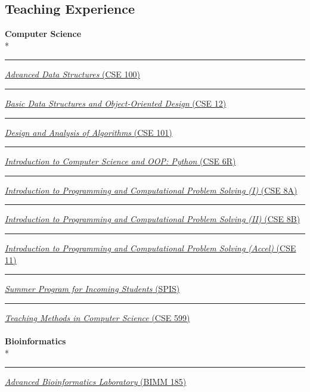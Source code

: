 \documentclass[margin,line]{res}
\begin{document}
\begin{resume}
\section{\sc Teaching Experience}
\textbf{Computer Science}\\*
\rule{-1mm}{5mm} \hspace*{4mm} \href{https://sites.google.com/a/eng.ucsd.edu/cse-100-winter-2016/}{\textit{Advanced Data Structures} (CSE 100)}\\
\rule{-1mm}{5mm} \hspace*{4mm} \href{http://ucsd.edu/catalog/courses/CSE.html#cse12}{\textit{Basic Data Structures and Object-Oriented Design} (CSE 12)}\\
\rule{-1mm}{5mm} \hspace*{4mm} \href{http://ucsd.edu/catalog/courses/CSE.html#cse101}{\textit{Design and Analysis of Algorithms} (CSE 101)}\\
\rule{-1mm}{5mm} \hspace*{4mm} \href{http://ucsd.edu/catalog/courses/CSE.html#cse6r}{\textit{Introduction to Computer Science and OOP: Python} (CSE 6R)}\\
\rule{-1mm}{5mm} \hspace*{4mm} \href{http://ucsd.edu/catalog/courses/CSE.html#cse8a}{\textit{Introduction to Programming and Computational Problem Solving (I)} (CSE 8A)}\\
\rule{-1mm}{5mm} \hspace*{4mm} \href{http://ucsd.edu/catalog/courses/CSE.html#cse8b}{\textit{Introduction to Programming and Computational Problem Solving (II)} (CSE 8B)}\\
\rule{-1mm}{5mm} \hspace*{4mm} \href{http://ucsd.edu/catalog/courses/CSE.html#cse11}{\textit{Introduction to Programming and Computational Problem Solving (Accel)} (CSE 11)}\\
\rule{-1mm}{5mm} \hspace*{4mm} \href{https://sites.google.com/a/eng.ucsd.edu/spis}{\textit{Summer Program for Incoming Students} (SPIS)}\\
\rule{-1mm}{5mm} \hspace*{4mm} \href{http://ucsd.edu/catalog/courses/CSE.html#cse599}{\textit{Teaching Methods in Computer Science} (CSE 599)}\\
~\\
\textbf{Bioinformatics}\\*
\rule{-1mm}{5mm} \hspace*{4mm} \href{http://www.ucsd.edu/catalog/courses/BIOL.html#bimm185}{\textit{Advanced Bioinformatics Laboratory} (BIMM 185)}\\

\end{resume}
\end{document}
